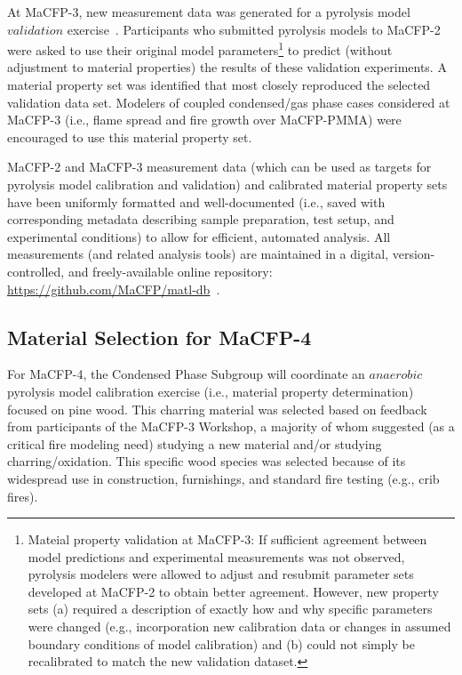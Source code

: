 \documentclass[12pt]{article}
\begin{document}
At MaCFP-3, new measurement data was generated for a pyrolysis model $validation$ exercise~\cite{MaCFP3Proceedings,leventon2023experimental}. Participants who submitted pyrolysis models to MaCFP-2 were asked to use their original model parameters\footnote{Mateial property validation at MaCFP-3: If sufficient agreement between model predictions and experimental measurements was not observed, pyrolysis modelers were allowed to adjust and resubmit parameter sets developed at MaCFP-2 to obtain better agreement. However, new property sets (a) required a description of exactly how and why specific parameters were changed (e.g., incorporation new calibration data or changes in assumed boundary conditions of model calibration) and (b) could not simply be recalibrated  to match the new validation dataset.} to predict (without adjustment to material properties) the results of these validation experiments. A material property set was identified that most closely reproduced the selected validation data set. Modelers of coupled condensed/gas phase cases considered at MaCFP-3 (i.e., flame spread and fire growth over MaCFP-PMMA) were encouraged to use this material property set. 

MaCFP-2 and MaCFP-3 measurement data (which can be used as targets for pyrolysis model calibration and validation) and calibrated material property sets have been uniformly formatted and well-documented (i.e., saved with corresponding metadata describing sample preparation, test setup, and experimental conditions) to allow for efficient, automated analysis. All measurements (and related analysis tools) are maintained in a digital, version-controlled, and freely-available online repository: \url{https://github.com/MaCFP/matl-db}~\cite{MaCFP-cond-db}.

\subsection{Material Selection for MaCFP-4}
\label{ssec: Pyrolysis Material Information}
For MaCFP-4, the Condensed Phase Subgroup will coordinate an $anaerobic$ pyrolysis model calibration exercise (i.e., material property determination) focused on pine wood. This charring material was selected based on feedback from participants of the MaCFP-3 Workshop, a majority of whom suggested (as a critical fire modeling need) studying a new material and/or studying charring/oxidation. This specific wood species was selected because of its widespread use in construction, furnishings, and standard fire testing (e.g., crib fires). 
\end{document}
